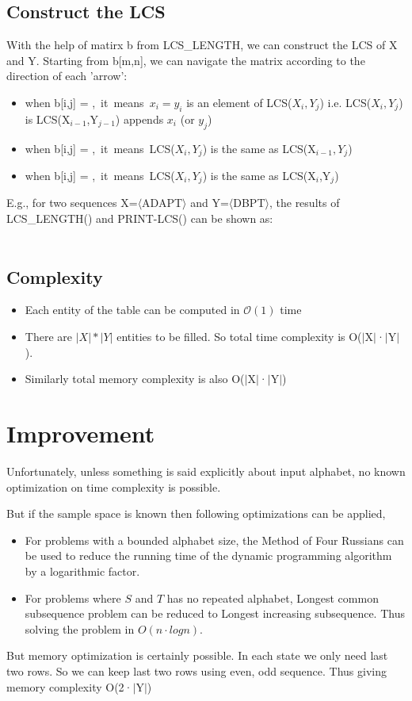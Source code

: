 \documentclass{report}
\begin{document}
    
    \newpage
    \section{Construct the LCS}
    With the help of matirx b from LCS\_LENGTH, we can construct the LCS of X and Y. Starting from b[m,n], we can navigate the matrix according to the direction of each 'arrow':
    \begin{itemize}
        \item when b[i,j] = \nwarrow,~it~means~$x_i=y_i$ is an element of LCS($X_i,Y_j$) i.e. LCS($X_i,Y_j$) is LCS(X$_{i-1}$,Y$_{j-1}$) appends $x_i$ (or $y_j$)
        \item when b[i,j] = \uparrow,~it~means~LCS($X_i,Y_j$) is the same as LCS(X$_{i-1},Y_j$)
        \item when b[i,j] = \leftarrow,~it~means~LCS($X_i,Y_j$) is the same as LCS(X$_i$,Y$_j$)
    \end{itemize}
    
    E.g., for two sequences X=$\langle$ADAPT$\rangle$ and Y=$\langle$DBPT$\rangle$, the results of LCS\_LENGTH() and PRINT-LCS() can be shown as:\\\\
    
    \section{Complexity}
    \begin{itemize}
        \item Each entity of the table can be computed in $\mathcal{O}(1)$ time
        \item There are $|X|*|Y|$ entities to be filled. So total time complexity is O($|$X$|$·$|$Y$|$).
        \item Similarly total memory complexity is also O($|$X$|$·$|$Y$|$)
    \end{itemize}
    \chapter{Improvement}
    Unfortunately, unless something is said explicitly about input alphabet, no known optimization on time complexity is possible.
    
    \bigskip
    But if the sample space is known then following optimizations can be applied,
    \begin{itemize}
        \item For problems with a bounded alphabet size, the Method of Four Russians can be used to reduce the running time of the dynamic programming algorithm by a logarithmic factor.
        \item For problems where $S$ and $T$ has no repeated alphabet, Longest common subsequence problem can be reduced to Longest increasing subsequence. Thus solving the problem in $O(n\cdot logn)$.
    \end{itemize}
    \bigskip
    But memory optimization is certainly possible. In each state we
    only need last two rows. So we can keep last two rows using even,
    odd sequence. Thus giving memory complexity O(2·$|$Y$|$)
    
\end{document}
